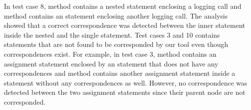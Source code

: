 In test case 8,  method contains a nested statement enclosing a logging call and  method contains an  statement enclosing another logging call. The analysis showed that a correct correspondence was detected between the inner statement inside the nested  and the single  statement. Test cases 3 and 10 contains statements that are not found to be corresponded by our tool even though correspondences exist. For example, in test case 3,  method contains an assignment statement enclosed by an  statement that does not have any correspondences and  method contains another assignment statement inside a  statement without any correspondences as well. However, no correspondence was detected between the two assignment statements since their parent node are not corresponded.    



